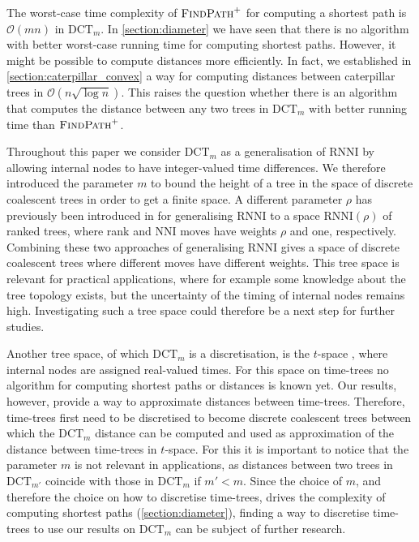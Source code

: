 \documentclass[11pt]{amsart}
\newcommand{\rnni}{\mathrm{RNNI}}
\newcommand{\findpath}{\textsc{FindPath}}
\newcommand{\nni}{\mathrm{NNI}}
\newcommand{\dct}{\mathrm{DCT}}
\renewcommand{\O}{\mathcal O}
\newcommand{\summary}[1]{} %
\begin{document}
\summary{More efficient algorithm for computing distances (not shortest paths)}
The worst-case time complexity of $\findpath^+$ for computing a shortest path is $\O(mn)$ in $\dct_m$.
In \autoref{section:diameter} we have seen that there is no algorithm with better worst-case running time for computing shortest paths.
However, it might be possible to compute distances more efficiently.
In fact, we established in \autoref{section:caterpillar_convex} a way for computing distances between caterpillar trees in $\O(n \sqrt{\log n})$.
This raises the question whether there is an algorithm that computes the distance between any two trees in $\dct_m$ with better running time than $\findpath^+$.

\summary{$\rnni(rho)$ and parameter $\rho$ for discrete coalescent trees}
Throughout this paper we consider $\dct_m$ as a generalisation of $\rnni$ by allowing internal nodes to have integer-valued time differences.
We therefore introduced the parameter $m$ to bound the height of a tree in the space of discrete coalescent trees in order to get a finite space.
A different parameter $\rho$ has previously been introduced in \textcite{Collienne2021} for generalising $\rnni$ to a space $\rnni(\rho)$ of ranked trees, where rank and $\nni$ moves have weights $\rho$ and one, respectively.
Combining these two approaches of generalising $\rnni$ gives a space of discrete coalescent trees where different moves have different weights.
This tree space is relevant for practical applications, where for example some knowledge about the tree topology exists, but the uncertainty of the timing of internal nodes remains high.
Investigating such a tree space could therefore be a next step for further studies.

\summary{t-space}
Another tree space, of which $\dct_m$ is a discretisation, is the $t$-space \autocite{Gavryushkin2016-uu}, where internal nodes are assigned real-valued times.
For this space on time-trees no algorithm for computing shortest paths or distances is known yet.
Our results, however, provide a way to approximate distances between time-trees.
Therefore, time-trees first need to be discretised to become discrete coalescent trees between which the $\dct_m$ distance can be computed and used as approximation of the distance between time-trees in $t$-space.
For this it is important to notice that the parameter $m$ is not relevant in applications, as distances between two trees in $\dct_{m'}$ coincide with those in $\dct_m$ if $m' < m$.
Since the choice of $m$, and therefore the choice on how to discretise time-trees, drives the complexity of computing shortest paths (\autoref{section:diameter}), finding a way to discretise time-trees to use our results on $\dct_m$ can be subject of further research.
\end{document}
